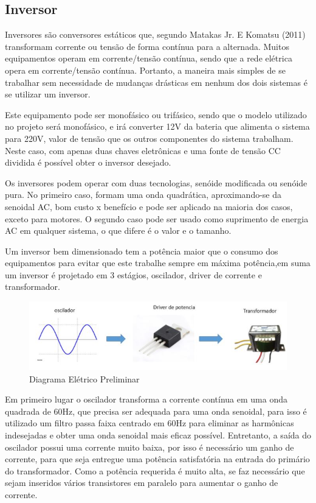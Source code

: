 \subsection{Inversor}
Inversores são conversores estáticos que, segundo Matakas Jr. E Komatsu (2011) transformam corrente ou tensão de forma contínua para a alternada. Muitos equipamentos operam em corrente/tensão contínua, sendo que a rede elétrica opera em corrente/tensão contínua. Portanto, a maneira mais simples de se trabalhar sem necessidade de mudanças drásticas em nenhum dos dois sistemas é se utilizar um inversor.

Este equipamento pode ser monofásico ou trifásico, sendo que o modelo utilizado no projeto será monofásico, e irá converter 12V da bateria que alimenta o sistema para 220V, valor de tensão que os outros componentes do sistema trabalham. Neste caso, com apenas duas chaves eletrônicas e uma fonte de tensão CC dividida é possível obter o inversor desejado.

Os inversores podem operar com duas tecnologias, senóide modificada ou senóide pura. No primeiro caso, formam uma onda quadrática, aproximando-se da senoidal AC, bom custo x benefício e pode ser aplicado na maioria dos casos, exceto para motores. O segundo caso pode ser usado como suprimento de energia AC em qualquer sistema, o que difere é o valor e o tamanho.

Um inversor bem dimensionado tem a potência maior que o consumo dos equipamentos para evitar que este trabalhe sempre em máxima potência,em suma um inversor é projetado em 3 estágios, oscilador, driver de corrente e transformador.
\begin{figure}[H]
	\begin{center}
		\includegraphics[scale = 0.75]{figuras/dim_inversor.JPG}
		\caption{ Diagrama Elétrico Preliminar}
	\end{center}
\end{figure}

Em primeiro lugar o oscilador transforma a corrente contínua em uma onda quadrada de 60Hz, que precisa ser adequada para uma onda senoidal, para isso é utilizado um filtro passa faixa centrado em 60Hz para eliminar as harmônicas indesejadas e obter uma onda senoidal mais eficaz possível. Entretanto, a saída do oscilador possui uma corrente muito baixa, por isso é necessário um ganho de corrente, para que seja entregue uma potência satisfatória na entrada do primário do transformador. Como a potência requerida é muito alta, se faz necessário que sejam inseridos vários transistores em paralelo para aumentar o ganho de corrente.

